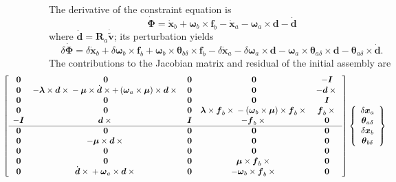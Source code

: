 \documentclass[10pt,dvips,fleqn]{report}
\newcommand{\T}[1]{\boldsymbol{#1}}
\begin{document}
The derivative of the constraint equation is
\begin{equation}
	\dot{\T{\Phi}} = 
		\dot{\T{x}}_b
		+ \T{\omega}_b \times \T{f}_b
		- \dot{\T{x}}_a
		- \T{\omega}_a \times \T{d}
		- \dot{\T{d}}
\end{equation}
where $\dot{\T{d}}=\T{R}_a\dot{\tilde{\T{v}}}$; its perturbation yields
\begin{equation}
	\delta\dot{\T{\Phi}}
	= \delta\dot{\T{x}}_b
	+ \delta\T{\omega}_b \times \T{f}_b
	+ \T{\omega}_b \times \T{\theta}_{b\delta} \times \T{f}_b
	- \delta\dot{\T{x}}_a
	- \delta\T{\omega}_a \times \T{d}
	- \T{\omega}_a \times \T{\theta}_{a\delta} \times \T{d}
	- \T{\theta}_{a\delta} \times \dot{\T{d}} .
\end{equation}
The contributions to the Jacobian matrix and residual 
of the initial assembly are
\begin{align}
	\small
	& \hspace{-20mm}\sqbr{\matr{ccccc}{
		\T{0} & \T{0} & \T{0} & \T{0} & -\T{I} \\	%
		\T{0} & -\T{\lambda}\times\T{d}\times{}
			- \T{\mu}\times\dot{\T{d}}\times
			+ \plbr{\T{\omega}_a\times\T{\mu}}\times\T{d}\times{} &
			\T{0} & \T{0} & -\T{d}\times{} \\	%
		\T{0} & \T{0} & \T{0} & \T{0} & \T{I} \\	%
		\T{0} & \T{0} & \T{0} & 
			\T{\lambda}\times\T{f}_b\times{}
			- \plbr{\T{\omega}_b\times\T{\mu}}\times\T{f}_b\times{} &
			\T{f}_b\times{} \\	%
		-\T{I} & \T{d}\times{} & \T{I} & -\T{f}_b\times{} &
			\T{0} \\				%
%
	\hline
		\T{0} & \T{0} & \T{0} & \T{0} & \T{0} \\	%
		\T{0} & -\T{\mu}\times\T{d}\times{} &
			\T{0} & \T{0} & \T{0} \\		%
		\T{0} & \T{0} & \T{0} & \T{0} & \T{0} \\	%
		\T{0} & \T{0} & \T{0} &
			\T{\mu}\times\T{f}_b\times{} & \T{0} \\	%
		\T{0} &
			\dot{\T{d}}\times{}
			+ \T{\omega}_a\times\T{d}\times{} &
			\T{0} &
			-\T{\omega}_b\times\T{f}_b\times{} &
			\T{0}					%
	}} \cubr{\cvvect{
		\delta\T{x}_a \\
		\T{\theta}_{a\delta} \\
		\delta\T{x}_b \\
		\T{\theta}_{b\delta} \\
}}
\end{align}
\end{document}
